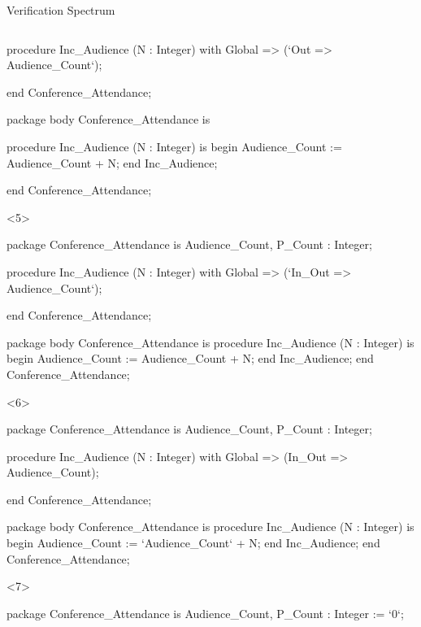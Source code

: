 \documentclass{beamer}
\begin{document}
\begin{frame}[fragile]{Verification Spectrum}
\begin{columns}
\begin{column}{9cm}
\begin{onlyenv}
\begin{pxcode}[language=SPARK,style=magic,gobble=8]
           procedure Inc_Audience (N : Integer)
           with Global => (`Out => Audience_Count`);

        end Conference_Attendance;

        package body Conference_Attendance
        is

           procedure Inc_Audience (N : Integer)
           is
           begin
              Audience_Count := Audience_Count + N;
           end Inc_Audience;

        end Conference_Attendance;
      \end{pxcode}
      \end{onlyenv}

      \begin{onlyenv}<5>
      \begin{pxcode}[language=SPARK,style=magic,gobble=8]
        package Conference_Attendance
        is
           Audience_Count, P_Count : Integer;

           procedure Inc_Audience (N : Integer)
           with Global => (`In_Out => Audience_Count`);

        end Conference_Attendance;

        package body Conference_Attendance
        is
           procedure Inc_Audience (N : Integer)
           is
           begin
              Audience_Count := Audience_Count + N;
           end Inc_Audience;
        end Conference_Attendance;
      \end{pxcode}
      \end{onlyenv}


      \begin{onlyenv}<6>
      \begin{pxcode}[language=SPARK,style=magic,gobble=8]
        package Conference_Attendance
        is
           Audience_Count, P_Count : Integer;

           procedure Inc_Audience (N : Integer)
           with Global => (In_Out => Audience_Count);

        end Conference_Attendance;

        package body Conference_Attendance
        is
           procedure Inc_Audience (N : Integer)
           is
           begin
              Audience_Count := `Audience_Count` + N;
           end Inc_Audience;
        end Conference_Attendance;
      \end{pxcode}
      \end{onlyenv}

      \begin{onlyenv}<7>
      \begin{pxcode}[language=SPARK,style=magic,gobble=8]
        package Conference_Attendance
        is
           Audience_Count, P_Count : Integer := `0`;


\end{pxcode}
\end{onlyenv}
\end{column}
\end{columns}
\end{frame}
\end{document}
